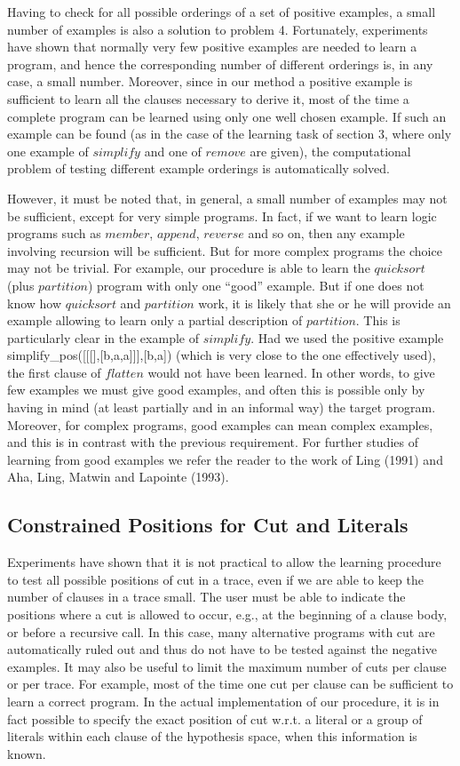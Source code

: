 Having to check for all possible orderings
of a set of positive examples,
a small number of examples is also a solution to problem 4.
Fortunately, experiments have shown that normally very
few positive examples are needed to learn a program, 
and hence the corresponding number of different orderings is, 
in any case, a small number.
Moreover, since in our method a positive 
example is sufficient to learn all the clauses necessary to derive it, 
most of the time a complete program can be learned using only one
well chosen example. If such an example can be found (as in the case
of the learning task of section 3, where only one example of $simplify$
and one of $remove$ are given),
the computational problem of testing different
example orderings is automatically solved.
 
However, it must be noted that, in general, a small
number of examples may not be sufficient, except for very simple
programs. In fact, if we want to learn logic programs such as
$member$, $append$, $reverse$ and so on, then any example 
involving recursion will be sufficient. But for more complex
programs the choice may not be trivial. For example, our procedure
is able to learn the $quicksort$ (plus $partition$) program with
only one ``good'' example. But if one does not know how 
$quicksort$ and $partition$ work, it is likely that she or he will provide
an example allowing to learn only a partial description of $partition$.
This is particularly clear in the example of $simplify$. Had we used
the positive example 
simplify\_pos([[[],[b,a,a]]],[b,a]) (which is very close to the one 
effectively used), the first clause of $flatten$ would not have been
learned. In other words, to give few examples we must give good
examples, and often this is possible only by having in mind (at least
partially and in an informal way) 
the target program. Moreover, for complex programs,
good examples can mean complex examples, and this is in
contrast with the previous requirement.
For further studies of learning from good examples we refer the reader to 
the work of Ling (1991) and Aha, Ling, Matwin and Lapointe (1993).
 
\subsection{Constrained Positions for Cut and Literals}
 
Experiments have shown that it is not practical to allow the learning
procedure to test all possible positions of cut in a trace, even 
if we are able to keep the number of clauses in a trace small. 
The user must be able to indicate the positions
where a cut is allowed to occur, e.g., at the beginning of a 
clause body,
or before a recursive call. In this case,
many alternative programs with cut are 
automatically ruled out and thus do not have to be tested 
against the negative examples. It may also be useful to limit the 
maximum number of cuts per clause or per trace. For example, 
most of the time one cut per clause can be sufficient to learn a
correct program. In the actual implementation of our procedure,
it is in fact possible to specify the exact position of  cut 
w.r.t. a literal or a group of literals within each clause of
the hypothesis space, when this information is known.
 
